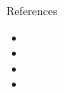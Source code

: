 \documentclass[final,t]{beamer}
\begin{document}
\begin{frame}{}
\begin{columns}[t]
\begin{column}{.30\linewidth}
\begin{block}{References}
{\small
  \begin{itemize} 
\item {}
\item {}
\item {}
\item {}
  \end{itemize}
}
% 
\end{block}
\end{column}


\end{columns}

\end{frame}
\end{document}
